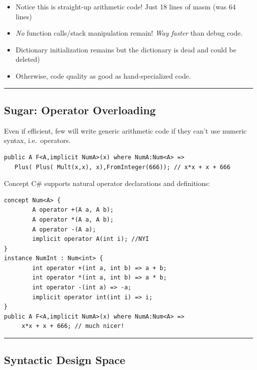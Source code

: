 \begin{itemize}
\tightlist
\item
  Notice this is straight-up arithmetic code! Just 18 lines of masm (was
  64 lines)
\item
  \emph{No} function calls/stack manipulation remain! \emph{Way faster}
  than debug code.
\item
  Dictionary initialization remains but the dictionary is dead and could
  be deleted)
\item
  Otherwise, code quality as good as hand-specialized code.
\end{itemize}

\begin{center}\rule{0.5\linewidth}{\linethickness}\end{center}

\subsection{Sugar: Operator
Overloading}\label{sugar-operator-overloading}

Even if efficient, few will write generic arithmetic code if they can't
use numeric syntax, i.e.~operators.

\begin{lstlisting}
public A F<A,implicit NumA>(x) where NumA:Num<A> =>            
   Plus( Plus( Mult(x,x), x),FromInteger(666)); // x*x + x + 666
\end{lstlisting}

Concept C\# supports natural operator declarations and definitions:

\begin{lstlisting}
concept Num<A> {
        A operator +(A a, A b);
        A operator *(A a, A b);
        A operator -(A a);
        implicit operator A(int i); //NYI
}
instance NumInt : Num<int> {
        int operator +(int a, int b) => a + b;
        int operator *(int a, int b) => a * b;
        int operator -(int a) => -a;
        implicit operator int(int i) => i;
}
public A F<A,implicit NumA>(x) where NumA:Num<A> =>         
     x*x + x + 666; // much nicer!
\end{lstlisting}

\begin{center}\rule{0.5\linewidth}{\linethickness}\end{center}

\subsection{Syntactic Design Space}\label{syntactic-design-space}

